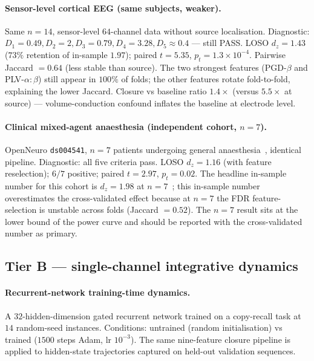 \documentclass[11pt,a4paper]{article}
\begin{document}
\paragraph{Sensor-level cortical EEG (same subjects, weaker).}
Same $n = 14$, sensor-level $64$-channel data without source localisation. Diagnostic: $D_1 = 0.49, D_2 = 2, D_3 = 0.79, D_4 = 3.28, D_5 \approx 0.4$ --- still PASS. LOSO $d_z = 1.43$ ($73\%$ retention of in-sample $1.97$); paired $t = 5.35$, $p_t = 1.3 \times 10^{-4}$. Pairwise Jaccard $= 0.64$ (less stable than source). The two strongest features (PGD-$\beta$ and PLV-$\alpha{:}\beta$) still appear in $100\%$ of folds; the other features rotate fold-to-fold, explaining the lower Jaccard. Closure vs baseline ratio $1.4\times$ (versus $5.5\times$ at source) --- volume-conduction confound inflates the baseline at electrode level.

\paragraph{Clinical mixed-agent anaesthesia (independent cohort, $n = 7$).}
OpenNeuro \texttt{ds004541}, $n = 7$ patients undergoing general anaesthesia~\citep{sainiferron2023dataset}, identical pipeline. Diagnostic: all five criteria pass. LOSO $d_z = 1.16$ (with feature reselection); $6/7$ positive; paired $t = 2.97$, $p_t = 0.02$. The headline in-sample number for this cohort is $d_z = 1.98$ at $n = 7$~\citep{SolutionLab002}; this in-sample number overestimates the cross-validated effect because at $n = 7$ the FDR feature-selection is unstable across folds (Jaccard $= 0.52$). The $n = 7$ result sits at the lower bound of the power curve and should be reported with the cross-validated number as primary.

\subsection{Tier B --- single-channel integrative dynamics}\label{sec:results-tier-b}

\paragraph{Recurrent-network training-time dynamics.}
A $32$-hidden-dimension gated recurrent network trained on a copy-recall task at $14$ random-seed instances. Conditions: untrained (random initialisation) vs trained ($1500$ steps Adam, lr $10^{-3}$). The same nine-feature closure pipeline is applied to hidden-state trajectories captured on held-out validation sequences.
\end{document}
